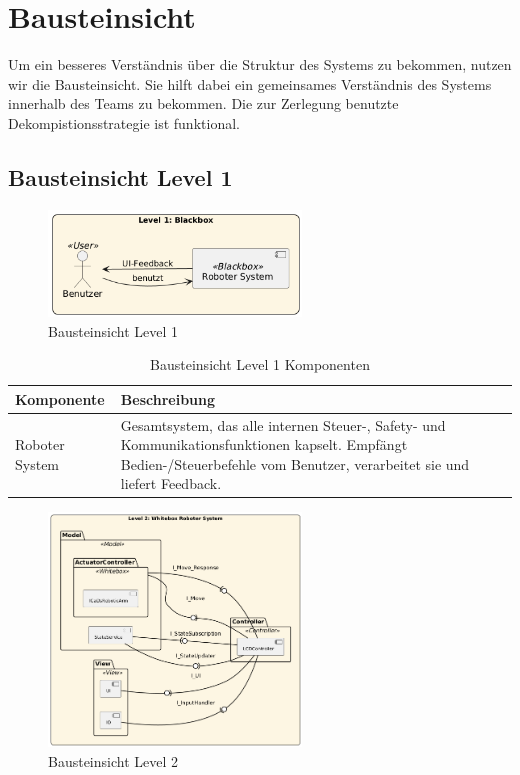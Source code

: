 \chapter{Bausteinsicht}

Um ein besseres Verständnis über die Struktur des Systems zu bekommen, nutzen wir die Bausteinsicht. Sie hilft dabei ein gemeinsames Verständnis des Systems innerhalb des Teams zu bekommen.
Die zur Zerlegung benutzte Dekompistionsstrategie ist funktional. 

\section{Bausteinsicht Level 1}
 

\begin{figure}[h] %
    \centering
    \includegraphics[width=0.6\textwidth]{diagrams/bausteinsicht_lvl_1_v2.png}
    \caption{Bausteinsicht Level 1}
\end{figure}

\begin{table}[h!]
\centering
\begin{tabular}{|p{4cm}|p{9cm}|}
\hline
\textbf{Komponente} & \textbf{Beschreibung} \\ \hline
Roboter System & Gesamtsystem, das alle internen Steuer-, Safety- und Kommunikations­funktionen kapselt. Empfängt Bedien-/Steuerbefehle vom Benutzer, verarbeitet sie und liefert Feedback. \\ \hline
\end{tabular}
\caption{Bausteinsicht Level 1 Komponenten}
\label{tab:lvl1}
\end{table}

\newpage

\begin{figure}[h] %
    \centering
    \includegraphics[width=0.6\textwidth]{diagrams/bausteinsicht_lvl_2_v2.png}
    \caption{Bausteinsicht Level 2}
\end{figure}

